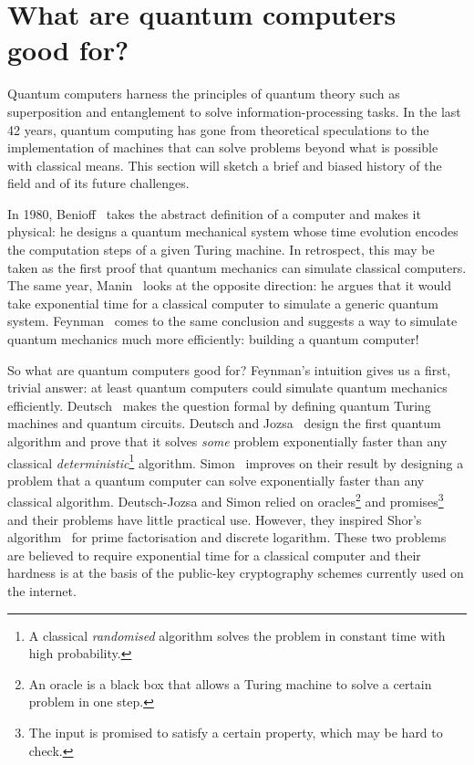 
\section*{What are quantum computers good for?}

Quantum computers harness the principles of quantum theory such as superposition and entanglement to solve information-processing tasks.
In the last 42 years, quantum computing has gone from theoretical speculations to the implementation of machines that can solve problems beyond what is possible with classical means.
This section will sketch a brief and biased history of the field and of its future challenges.

In 1980, Benioff~\cite{Benioff80} takes the abstract definition of a computer and makes it physical: he designs a quantum mechanical system whose time evolution encodes the computation steps of a given Turing machine.
In retrospect, this may be taken as the first proof that quantum mechanics can simulate classical computers.
The same year, Manin~\cite{Manin80} looks at the opposite direction: he argues that it would take exponential time for a classical computer to simulate a generic quantum system.
Feynman~\cite{Feynman82,Feynman85} comes to the same conclusion and suggests a way to simulate quantum mechanics much more efficiently: building a quantum computer!

So what are quantum computers good for? Feynman's intuition gives us a
first, trivial answer: at least quantum computers could simulate quantum
mechanics efficiently. Deutsch~\cite{Deutsch85a} makes the question formal by
defining quantum Turing machines and quantum circuits.
Deutsch and Jozsa~\cite{DeutschJozsa92}
design the first quantum algorithm and prove that it solves
\emph{some} problem exponentially faster than any classical
\emph{deterministic}\footnote
{A classical \emph{randomised} algorithm solves the
problem in constant time with high probability.} algorithm.
Simon~\cite{Simon94} improves on their result by designing a problem that a
quantum computer can solve exponentially faster than any classical
algorithm. Deutsch-Jozsa and Simon relied on
oracles\footnote{An oracle is
a black box that allows a Turing machine to solve a certain problem in one step.}
and promises\footnote
{The input is promised to satisfy a certain property, which may be hard to check.}
and their problems have little practical use. However, they inspired Shor's
algorithm~\cite{Shor94a} for prime factorisation and discrete logarithm. These
two problems are believed to require exponential time for a classical
computer and their hardness is at the basis of the public-key
cryptography schemes currently used on the internet.

